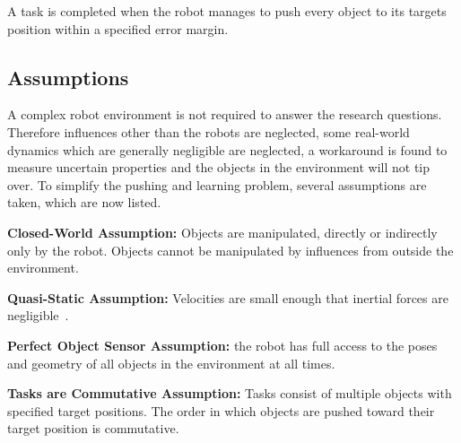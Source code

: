 A task is completed when the robot manages to push every object to its targets position within a specified error margin. 

\subsection{Assumptions}%
\label{subsec:assumptions}
A complex robot environment is not required to answer the research questions. Therefore influences other than the robots are neglected, some real-world dynamics which are generally negligible are neglected, a workaround is found to measure uncertain properties and the objects in the environment will not tip over. To simplify the pushing and learning problem, several assumptions are taken, which are now listed.\bs
{}

\begin{assumption*}%
\label{assumption:closed_world}
\textbf{Closed-World Assumption:} Objects are manipulated, directly or indirectly only by the robot. Objects cannot be manipulated by influences from outside the environment.
\end{assumption*}\bs

\begin{assumption*}%
\label{assumption:quasi_static}
\textbf{Quasi-Static Assumption:} Velocities are small enough that inertial forces are negligible~\cite{stuber_let_2020}.
\end{assumption*}\bs
{}

\begin{assumption*}%
\label{assumption:perfect_object_sensor}
\textbf{Perfect Object Sensor Assumption:} the robot has full access to the poses and geometry of all objects in the environment at all times.
\end{assumption*}\bs

\begin{assumption*}%
\label{assumption:order_does_not_matter}
\textbf{Tasks are Commutative Assumption:} Tasks consist of multiple objects with specified target positions. The order in which objects are pushed toward their target position is commutative.
\end{assumption*}\bs

